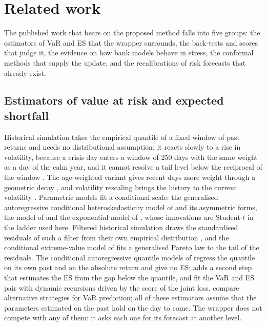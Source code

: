 \section{Related work}
\label{sec:related-work}

The published work that bears on the proposed method falls into five groups: the estimators of VaR and ES that the wrapper surrounds, the back-tests and scores that judge it, the evidence on how bank models behave in stress, the conformal methods that supply the update, and the recalibrations of risk forecasts that already exist.

\subsection{Estimators of value at risk and expected shortfall}
\label{sec:rw-estimators}

Historical simulation takes the empirical quantile of a fixed window of past returns and needs no distributional assumption; it reacts slowly to a rise in volatility, because a crisis day enters a window of 250 days with the same weight as a day of the calm year, and it cannot resolve a tail level below the reciprocal of the window \citep{pritsker2006}. The age-weighted variant gives recent days more weight through a geometric decay \citep{boudoukh1998}, and volatility rescaling brings the history to the current volatility \citep{hullwhite1998}. Parametric models fit a conditional scale: the generalised autoregressive conditional heteroskedasticity model of \citet{bollerslev1986} and its asymmetric forms, the model of \citet{gjr1993} and the exponential model of \citet{nelson1991}, whose innovations are Student-$t$ in the ladder used here. Filtered historical simulation draws the standardised residuals of such a filter from their own empirical distribution \citep{barone1999}, and the conditional extreme-value model of \citet{mcneilfrey2000} fits a generalised Pareto law to the tail of the residuals. The conditional autoregressive quantile models of \citet{engle2004} regress the quantile on its own past and on the absolute return and give no ES; \citet{taylor2019} adds a second step that estimates the ES from the gap below the quantile, and \citet{pattonziegelchen2019} fit the VaR and ES pair with dynamic recursions driven by the score of the joint loss. \citet{kuester2006} compare alternative strategies for VaR prediction; all of these estimators assume that the parameters estimated on the past hold on the day to come. The wrapper does not compete with any of them: it asks each one for its forecast at another level.

